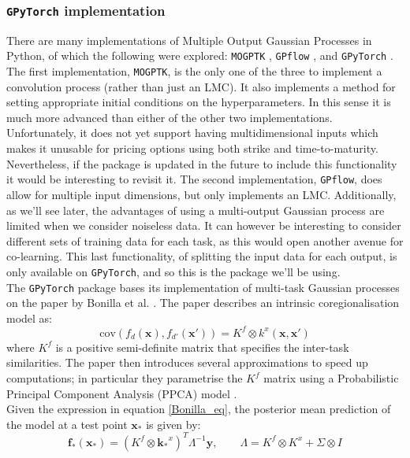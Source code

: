 \documentclass[a4paper,12pt]{article}
\begin{document}
\subsubsection{\texttt{GPyTorch} implementation}
There are many implementations of Multiple Output Gaussian Processes in Python, of which the following were explored: \texttt{MOGPTK} \cite{mogptk}, \texttt{GPflow} \cite{GPflow2017}, and \texttt{GPyTorch} \cite{gardner2018gpytorch}. The first implementation, \texttt{MOGPTK}, is the only one of the three to implement a convolution process (rather than just an LMC). It also implements a method for setting appropriate initial conditions on the hyperparameters. In this sense it is much more advanced than either of the other two implementations. Unfortunately, it does not yet support having multidimensional inputs which makes it unusable for pricing options using both strike and time-to-maturity. Nevertheless, if the package is updated in the future to include this functionality it would be interesting to revisit it. The second implementation, \texttt{GPflow}, does allow for multiple input dimensions, but only implements an LMC. Additionally, as we'll see later, the advantages of using a multi-output Gaussian process are limited when we consider noiseless data. It can however be interesting to consider different sets of training data for each task, as this would open another avenue for co-learning. This last functionality, of splitting the input data for each output, is only available on \texttt{GPyTorch}, and so this is the package we'll be using.\\
The \texttt{GPyTorch} package bases its implementation of multi-task Gaussian processes on the paper by Bonilla et al. \cite{Bonilla2007}. The paper describes an intrinsic coregionalisation model as: 
\begin{equation}
\label{Bonilla_eq}
\text{cov}(f_d(\mathbf{x}), f_{d'}(\mathbf{x'})) = K^f \otimes k^x(\mathbf{x}, \mathbf{x'})
\end{equation}
where $K^f$ is a positive semi-definite matrix that specifies the inter-task similarities. The paper then introduces several approximations to speed up computations; in particular they parametrise the $K^f$ matrix using a Probabilistic Principal Component Analysis (PPCA) model \cite{Tipping1999}.\\
Given the expression in equation \ref{Bonilla_eq}, the posterior mean prediction of the model at a test point $\mathbf{x_*}$ is given by:
\begin{equation}
    \mathbf{f_*}(\mathbf{x_*}) = (K^f \otimes \mathbf{k_*}^x)^T \Lambda^{-1} \mathbf{y}, \qquad \Lambda = K^f \otimes K^x + \Sigma \otimes I
\end{equation}
\end{document}
